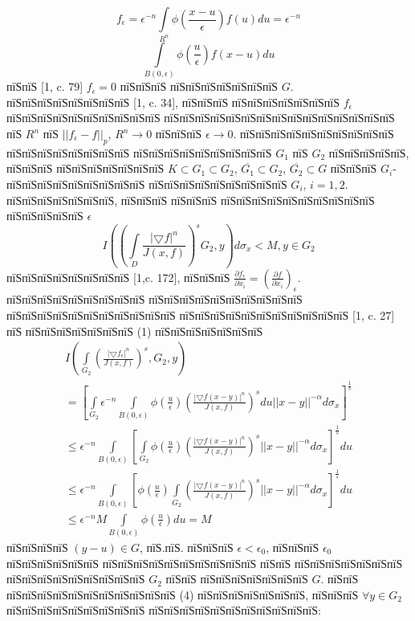 \documentclass[a5paper, 12pt, openbib]{report}
\begin{document}
$$
f_{\epsilon}=\epsilon^{-n}\int\limits_{R^n}\phi\left(\frac{x-u}{\epsilon}\right)f(u)du=\epsilon^{-n}$$
$$\int\limits_{B(0,\epsilon)}\phi\left(\frac{u}{\epsilon}\right)f(x-u)du
$$
пїЅпїЅ [1, c. 79] $f_{\epsilon}=0$ пїЅпїЅпїЅ пїЅпїЅпїЅпїЅпїЅпїЅпїЅ $G$. пїЅпїЅпїЅпїЅпїЅпїЅпїЅпїЅ [1, c. 34], пїЅпїЅпїЅ пїЅпїЅпїЅпїЅпїЅпїЅпїЅ $f_{\epsilon}$ пїЅпїЅпїЅпїЅпїЅпїЅпїЅпїЅпїЅпїЅ пїЅпїЅпїЅпїЅпїЅпїЅпїЅпїЅпїЅпїЅпїЅпїЅпїЅпїЅпїЅ пїЅ $R^n$ пїЅ $||f_{\epsilon}-f||_p$, $R^{n}\to 0$  пїЅпїЅпїЅ $\epsilon\to 0$. пїЅпїЅпїЅпїЅпїЅпїЅпїЅпїЅпїЅпїЅ пїЅпїЅпїЅпїЅпїЅпїЅпїЅпїЅ пїЅпїЅпїЅпїЅпїЅпїЅпїЅпїЅпїЅ $G_1$  пїЅ $G_2$ пїЅпїЅпїЅпїЅпїЅ, пїЅпїЅпїЅ пїЅпїЅпїЅпїЅпїЅпїЅпїЅ  $K\subset G_{1} \subset G_{2}$, $\overline{G_1}\subset G_{2}$, $\overline{G_2}\subset G$ пїЅпїЅпїЅ $G_i$- пїЅпїЅпїЅпїЅпїЅпїЅпїЅпїЅпїЅ пїЅпїЅпїЅпїЅпїЅпїЅпїЅпїЅпїЅ $G_i$, $i=1,2$.
 	пїЅпїЅпїЅпїЅпїЅпїЅпїЅ, пїЅпїЅпїЅ пїЅпїЅпїЅ пїЅпїЅпїЅпїЅпїЅпїЅпїЅпїЅпїЅпїЅ пїЅпїЅпїЅпїЅпїЅ $\epsilon$
 	$$I\left(\left(
\int\limits_D\frac{|\bigtriangledown f|^{n}}{J(x,f)}
\right)^{s}G_{2},y\right) d\sigma_{x}<M, y\in G_2$$
пїЅпїЅпїЅпїЅпїЅпїЅпїЅпїЅ [1,c. 172], пїЅпїЅпїЅ $\frac{\partial f_\epsilon}{\partial x_i}=\left(\frac{\partial f}{\partial x_i}\right)_\epsilon$. пїЅпїЅпїЅпїЅпїЅпїЅпїЅпїЅпїЅ пїЅпїЅпїЅпїЅпїЅпїЅпїЅпїЅпїЅпїЅ пїЅпїЅпїЅпїЅпїЅпїЅпїЅпїЅпїЅпїЅпїЅ пїЅпїЅпїЅпїЅпїЅпїЅпїЅпїЅпїЅпїЅпїЅ [1, c. 27] пїЅ пїЅпїЅпїЅпїЅпїЅпїЅпїЅ (1) пїЅпїЅпїЅпїЅпїЅпїЅпїЅ 
\begin{multline}
I\left(\int\limits_{G_2}\left(\frac{|\bigtriangledown f_{\epsilon}|^{n}}{J(x,f)}\right)^s, G_{2},y\right)\\
=\left[ \int\limits_{G_2}\epsilon^{-n}\int\limits_{B(0,\epsilon)}\phi\left(\frac{u}{\epsilon}\right)\left(\frac{|\bigtriangledown f(x-y)|^{n}}{J(x,f)}\right)^{s}
du||x-y||^{-\alpha}d\sigma_{x}\right]^{\frac{1}{s}}\\
\leq\epsilon^{-n}\int\limits_{B(0,\epsilon)}\left[\int\limits_{G_2}\phi\left(\frac{u}{\epsilon}\right)\left(\frac{|\bigtriangledown f(x-y)|^{n}}{J(x,f)}\right)^{s}||x-y||^{-\alpha}d\sigma_{x}\right]^{\frac{1}{s}}du
\\\leq\epsilon^{-n}\int\limits_{B(0,\epsilon)}\left[\phi\left(\frac{u}{\epsilon}\right)\int\limits_{G_2}\left(\frac{|\bigtriangledown f(x-y)|^{n}}{J(x,f)}\right)^{s}||x-y||^{-\alpha}d\sigma_{x}\right]^{\frac{1}{s}}du\\
\leq\epsilon^{-n}M\int\limits_{B(0,\epsilon)}\phi\left(\frac{u}{\epsilon}\right)du=M
\end{multline}
пїЅпїЅпїЅпїЅ $(y-u)\in G$, пїЅ.пїЅ. пїЅпїЅпїЅ $\epsilon<\epsilon_0$, пїЅпїЅпїЅ $\epsilon_0$ пїЅпїЅпїЅпїЅпїЅпїЅ пїЅпїЅпїЅпїЅпїЅпїЅпїЅпїЅпїЅпїЅ пїЅпїЅ пїЅпїЅпїЅпїЅпїЅпїЅпїЅ пїЅпїЅпїЅпїЅпїЅпїЅпїЅпїЅпїЅ $G_2$ пїЅпїЅ пїЅпїЅпїЅпїЅпїЅпїЅпїЅ $G$. пїЅпїЅ пїЅпїЅпїЅпїЅпїЅпїЅпїЅпїЅпїЅпїЅпїЅ (4) пїЅпїЅпїЅпїЅпїЅпїЅпїЅ, пїЅпїЅпїЅ $\forall y\in G_2$ пїЅпїЅпїЅпїЅпїЅпїЅпїЅпїЅпїЅ пїЅпїЅпїЅпїЅпїЅпїЅпїЅпїЅпїЅпїЅпїЅ:
\end{document}
